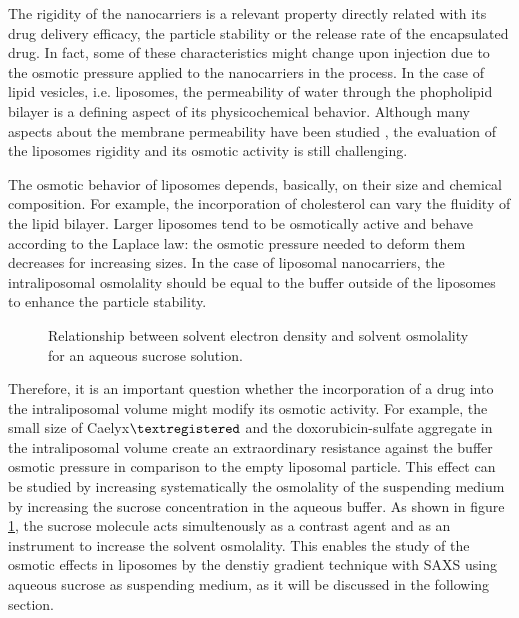 The rigidity of the nanocarriers is a relevant property directly related with its drug delivery efficacy, the particle stability or the release rate of the encapsulated drug. In fact, some of these characteristics might change upon injection due to the osmotic pressure applied to the nanocarriers in the process. In the case of lipid vesicles, i.e. liposomes, the permeability of water through the phopholipid bilayer is a defining aspect of its physicochemical behavior. Although many aspects about the membrane permeability have been studied \cite{nagle_theory_2008, mathai_structural_2008, olbrich_water_2000}, the evaluation of the liposomes rigidity and its osmotic activity is still challenging.

The osmotic behavior of liposomes depends, basically, on their size and chemical composition. For example, the incorporation of cholesterol can vary the fluidity of the lipid bilayer. Larger liposomes tend to be osmotically active \cite{de_gier_osmotic_1993} and behave according to the Laplace law: the osmotic pressure needed to deform them decreases for increasing sizes. In the case of liposomal nanocarriers, the intraliposomal osmolality should be equal to the buffer outside of the liposomes to enhance the particle stability. 

\begin{figure}
	\centering
		
		\caption{Relationship between solvent electron density and solvent osmolality for an aqueous sucrose solution.}
		\label{fig:OsmolalityElectronDensity}
\end{figure}

Therefore, it is an important question whether the incorporation of a drug into the intraliposomal volume might modify its osmotic activity. For example, the small size of Caelyx$\textregistered$ and the doxorubicin-sulfate aggregate in the intraliposomal volume create an extraordinary resistance against the buffer osmotic pressure in comparison to the empty liposomal particle. This effect can be studied by increasing systematically the osmolality of the suspending medium by increasing the sucrose concentration in the aqueous buffer. As shown in figure \ref{fig:OsmolalityElectronDensity}, the sucrose molecule acts simultenously as a contrast agent and as an instrument to increase the solvent osmolality. This enables the study of the osmotic effects in liposomes by the denstiy gradient technique with SAXS using aqueous sucrose as suspending medium, as it will be discussed in the following section.

